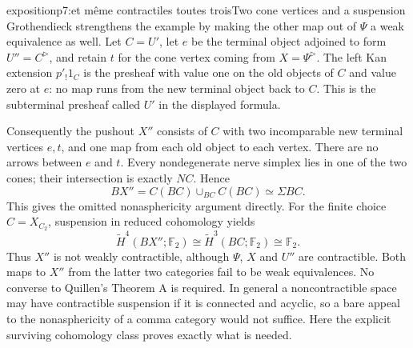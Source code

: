 \begin{dcomment}{exposition}{p7:et même contractiles toutes trois}{Two cone vertices and a suspension}
Grothendieck strengthens the example by making the other map out of $\Psi$ a weak equivalence as well. Let $C=U'$, let $e$ be the terminal object adjoined to form $U''=C^{\triangleright}$, and retain $t$ for the cone vertex coming from $X=\Psi^{\triangleright}$. The left Kan extension $p'_!1_C$ is the presheaf with value one on the old objects of $C$ and value zero at $e$: no map runs from the new terminal object back to $C$. This is the subterminal presheaf called $U'$ in the displayed formula.

Consequently the pushout $X''$ consists of $C$ with two incomparable new terminal vertices $e,t$, and one map from each old object to each vertex. There are no arrows between $e$ and $t$. Every nondegenerate nerve simplex lies in one of the two cones; their intersection is exactly $NC$. Hence
\[
 BX''=C(BC)\cup_{BC}C(BC)\simeq\Sigma BC.
\]
This gives the omitted nonasphericity argument directly. For the finite choice $C=X_{C_2}$, suspension in reduced cohomology yields
\[
 \widetilde H^4(BX'';\mathbb F_2)
   \cong\widetilde H^3(BC;\mathbb F_2)
   \cong\mathbb F_2.
\]
Thus $X''$ is not weakly contractible, although $\Psi$, $X$ and $U''$ are contractible. Both maps to $X''$ from the latter two categories fail to be weak equivalences. No converse to Quillen's Theorem A is required. In general a noncontractible space may have contractible suspension if it is connected and acyclic, so a bare appeal to the nonasphericity of a comma category would not suffice. Here the explicit surviving cohomology class proves exactly what is needed.
\end{dcomment}


